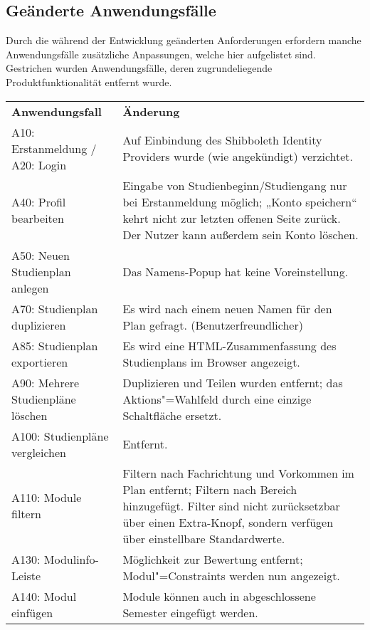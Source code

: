 \FloatBarrier
\subsection{Geänderte Anwendungsfälle}

Durch die während der Entwicklung geänderten Anforderungen erfordern manche Anwendungsfälle zusätzliche Anpassungen, welche hier aufgelistet sind. Gestrichen wurden Anwendungsfälle, deren zugrundeliegende Produktfunktionalität entfernt wurde.

\begin{longtable}{| >{\hspace{0pt}} p{} | >{\hspace{0pt}} p{} |}
	\hline
	\textbf{Anwendungsfall} & \textbf{Änderung} \\ 
	\hhline{|=|=|}  
	\endfirsthead
	\endhead
	A10: Erstanmeldung / \newline A20: Login 
	& Auf Einbindung des Shibboleth Identity Providers wurde (wie angekündigt) verzichtet. \\
	\hline
	A40: Profil bearbeiten
	& Eingabe von Studienbeginn/Studiengang nur bei Erstanmeldung möglich; „Konto speichern“ kehrt nicht zur letzten offenen Seite zurück. Der Nutzer kann außerdem sein Konto löschen. \\
	\hline
	A50: Neuen Studienplan anlegen
	& Das Namens-Popup hat keine Voreinstellung. \\
	\hline
	A70: Studienplan duplizieren
	& Es wird nach einem neuen Namen für den Plan gefragt. (Benutzerfreundlicher) \\
	\hline
	A85: Studienplan exportieren
	& Es wird eine HTML-Zusammenfassung des Studienplans im Browser angezeigt. \\
	\hline
	A90: Mehrere Studienpläne löschen
	& Duplizieren und Teilen wurden entfernt; das Aktions"=Wahlfeld durch eine einzige Schaltfläche ersetzt. \\ 
	\hline
	A100: Studienpläne vergleichen
	& Entfernt. \\
	\hline
	A110: Module filtern
	& Filtern nach Fachrichtung und Vorkommen im Plan entfernt; Filtern nach Bereich hinzugefügt. Filter sind nicht zurücksetzbar über einen Extra-Knopf, sondern verfügen über einstellbare Standardwerte.\\
	\hline
	A130: Modulinfo-Leiste
	& Möglichkeit zur Bewertung entfernt; Modul"=Constraints werden nun angezeigt. \\
	\hline
	A140: Modul einfügen
	& Module können auch in abgeschlossene Semester eingefügt werden. \\

\end{longtable}
